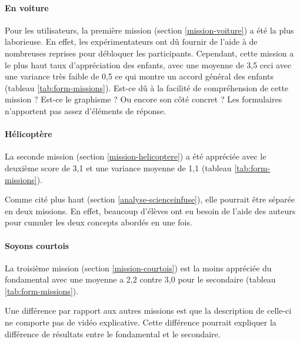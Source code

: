 \paragraph{En voiture}
Pour les utilisateurs, la première \gls{mission} (section \ref{mission-voiture}) a été la plus laborieuse. En effet, les expérimentateurs ont dû fournir de l'aide à de nombreuses reprises pour débloquer les participants. Cependant, cette \gls{mission} a le plus haut taux d'appréciation des enfants, avec une moyenne de 3,5 ceci avec une variance très faible de 0,5 ce qui montre un accord général des enfants (tableau \ref{tab:form-missions}). Est-ce dû à la facilité de compréhension de cette \gls{mission} ? Est-ce le graphisme ? Ou encore son côté concret ? Les formulaires n'apportent pas assez d'éléments de réponse.

\paragraph{Hélicoptère}
La seconde \gls{mission} (section \ref{mission-helicoptere}) a été appréciée avec le deuxième score de 3,1 et une variance moyenne de 1,1 (tableau \ref{tab:form-missions}).

Comme cité plus haut (section \ref{analyse-scienceinfuse}), elle pourrait être séparée en deux \glspl{mission}. En effet, beaucoup d'élèves ont eu besoin de l'aide des auteurs pour cumuler les deux concepts abordés en une fois.

\paragraph{Soyons courtois}
La troisième \gls{mission} (section \ref{mission-courtois}) est la moins appréciée du \gls{fondamental} avec une moyenne a 2,2 contre 3,0 pour le \gls{secondaire} (tableau \ref{tab:form-missions}).

Une différence par rapport aux autres \glspl{mission} est que la description de celle-ci ne comporte pas de vidéo explicative. Cette différence pourrait expliquer la différence de résultats entre le \gls{fondamental} et le \gls{secondaire}.

